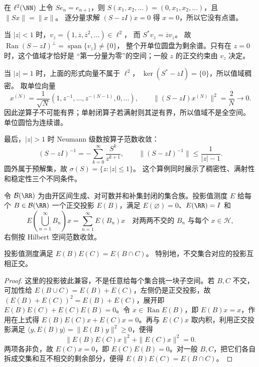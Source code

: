 \begin{workedexample}[单边移位的连续谱与剩余谱]
在 $\ell^2(\NN)$ 上令 $Se_n=e_{n+1}$，则
$S(x_1,x_2,\dots)=(0,x_1,x_2,\dots)$，且 $\|Sx\|=\|x\|$。
逐分量求解 $(S-zI)x=0$ 得 $x=0$，所以它没有点谱。

当 $|z|<1$ 时，$v_z=(1,\overline z,\overline z^2,\dots)\in\ell^2$，
而 $S^*v_z=\overline z v_z$。
故 $\operatorname{Ran}(S-zI)^\perp=\operatorname{span}\{v_z\}\ne\{0\}$，
整个开单位圆盘为剩余谱。只有在 $z=0$ 时，这个值域才恰好是
“第一分量为零”的空间；一般 $z$ 的正交约束由 $v_z$ 决定。

当 $|z|=1$ 时，上面的形式向量不属于 $\ell^2$，
$\ker(S^*-\overline zI)=\{0\}$，所以值域稠密。
取单位向量
\[
x^{(N)}=\frac1{\sqrt N}(1,z^{-1},\dots,z^{-(N-1)},0,\dots),
\qquad \|(S-zI)x^{(N)}\|^2=\frac2N\longrightarrow0.
\]
因此逆算子不可能有界；单射闭算子若满射则其逆有界，所以值域不是全空间。
单位圆恰为连续谱。

最后，$|z|>1$ 时 Neumann 级数按算子范数收敛：
\[
(S-zI)^{-1}=-\sum_{k=0}^\infty\frac{S^k}{z^{k+1}},
\qquad \|(S-zI)^{-1}\|\le\frac1{|z|-1}.
\]
圆外属于预解集，故 $\sigma(S)=\{z:|z|\le1\}$。
这个算例同时展示了稠密性、满射性和稳定性三个不同条件。
\end{workedexample}

\begin{definition}[投影值测度]
令 \(\mathcal B(\RR)\) 为由开区间生成、对可数并和补集封闭的集合族。投影值测度 \(E\) 给每个 \(B\in\mathcal B(\RR)\) 一个正交投影 \(E(B)\)，满足 \(E(\varnothing)=0\)、\(E(\RR)=I\) 和
\[
E\!\left(\bigcup_{n=1}^\infty B_n\right)x=\sum_{n=1}^\infty E(B_n)x
\quad\text{对两两不交的 }B_n\text{ 与每个 }x\in\mathcal H,
\]
右侧按 Hilbert 空间范数收敛。
\end{definition}

\begin{proposition}[谱投影的相乘]
投影值测度满足 $E(B)E(C)=E(B\cap C)$。
特别地，不交集合对应的投影互相正交。
\end{proposition}
\begin{proof}
这里的投影彼此兼容，不是任意给每个集合挑一块子空间。若 \(B,C\) 不交，可加性给 \(E(B\cup C)=E(B)+E(C)\)，左侧仍是正交投影，故 \((E(B)+E(C))^2=E(B)+E(C)\)，展开即 \(E(B)E(C)+E(C)E(B)=0\)。令 \(x\in\operatorname{Ran}E(B)\)，即 \(E(B)x=x\)，作用在上式得 \(E(B)E(C)x+E(C)x=0\)。再与 \(E(C)x\) 取内积，利用正交投影满足 \(\langle y,E(B)y\rangle=\|E(B)y\|^2\ge0\)，便得
\[
\|E(B)E(C)x\|^2+\|E(C)x\|^2=0.
\]
两项各非负，故 \(E(C)x=0\)，即 \(E(C)E(B)=0\)。对一般 \(B,C\)，把它们各自拆成交集和互不相交的剩余部分，便得 \(E(B)E(C)=E(B\cap C)\)。
\end{proof}

